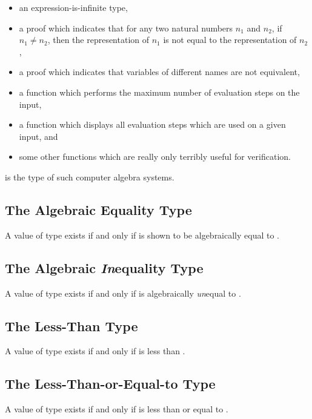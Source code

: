 \documentclass{report}
\begin{document}
\begin{itemize}
  \item an expression-is-infinite type,
  \item a proof which indicates that for any two natural numbers \(n_1\) and \(n_2\), if \(n_1 \neq n_2\), then the representation of \(n_1\) is not equal to the representation of \(n_2\),
  \item a proof which indicates that variables of different names are not equivalent,
  \item a function which performs the maximum number of evaluation steps on the input,
  \item a function which displays all evaluation steps which are used on a given input, and
  \item some other functions which are really only terribly useful for verification.
\end{itemize}

 is the type of such computer algebra systems.

\subsection{The Algebraic Equality Type}
A value of type     exists if and only if  is shown to be algebraically equal to .

\subsection{The Algebraic \emph{In}equality Type}
A value of type     exists if and only if  is algebraically \emph{un}equal to .

\subsection{The Less-Than Type}
A value of type    exists if and only if  is less than .

\subsection{The Less-Than-or-Equal-to Type}
A value of type    exists if and only if  is less than or equal to .
\end{document}
